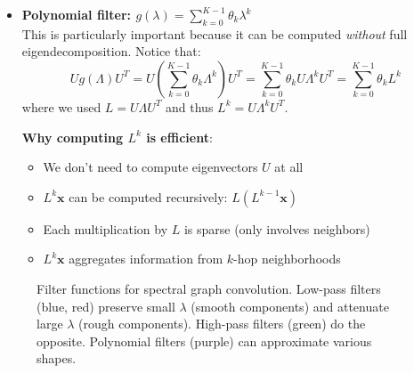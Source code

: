 \begin{notechapter}
\begin{itemize}
\item \textbf{Polynomial filter: $g(\lambda) = \sum_{k=0}^{K-1} \theta_k \lambda^k$} \\
This is particularly important because it can be computed \emph{without} 
full eigendecomposition. Notice that:
\[
U g(\Lambda) U^T = U\left(\sum_{k=0}^{K-1} \theta_k \Lambda^k\right) U^T 
= \sum_{k=0}^{K-1} \theta_k U\Lambda^k U^T 
= \sum_{k=0}^{K-1} \theta_k L^k
\]
where we used $L = U\Lambda U^T$ and thus $L^k = U\Lambda^k U^T$.

\textbf{Why computing $L^k$ is efficient}: 
\begin{itemize}
    \item We don't need to compute eigenvectors $U$ at all
    \item $L^k\mathbf{x}$ can be computed recursively: $L(L^{k-1}\mathbf{x})$
    \item Each multiplication by $L$ is sparse (only involves neighbors)
    \item $L^k\mathbf{x}$ aggregates information from $k$-hop neighborhoods
\end{itemize}
\end{itemize}

\begin{figure}[H]
\centering
{}
\caption{Filter functions for spectral graph convolution. Low-pass filters 
         (blue, red) preserve small $\lambda$ (smooth components) and attenuate 
         large $\lambda$ (rough components). High-pass filters (green) do the 
         opposite. Polynomial filters (purple) can approximate various shapes.}
\end{figure}


\end{notechapter}
